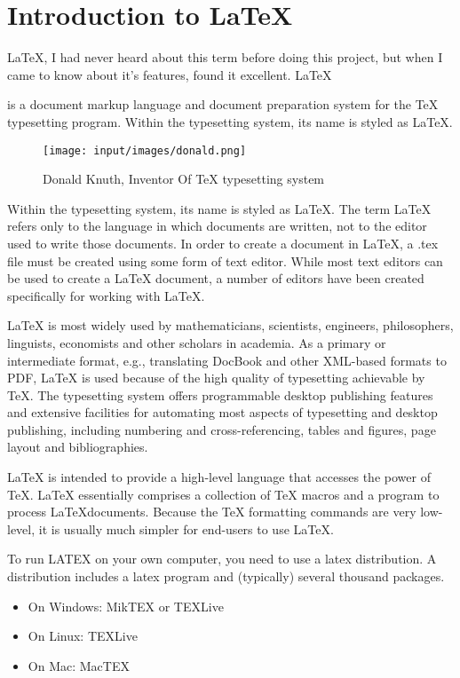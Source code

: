
\section{Introduction to \LaTeX}

\LaTeX, I had never heard about this term before doing this project,
but when I came to know about it's features, found it excellent. 
\LaTeX{ is a document markup language and document preparation system for the \TeX{} 
typesetting program. Within the typesetting system, its name is styled 
as \LaTeX.

\begin{figure}[!ht]
\centering
\texttt{[image: input/images/donald.png]}                   
\caption{Donald Knuth, Inventor Of \TeX{} 
typesetting system}
\hspace{-1.5em}
\end{figure}

Within the typesetting system, its name is styled as \LaTeX. The term 
\LaTeX{} refers only to the language in which documents are written, 
not to the editor used to write those documents. In order to create a 
document in \LaTeX, a .tex file must be created using some form of text 
editor. While most text editors can be used to create a \LaTeX{} document, 
a number of editors have been created specifically for working with \LaTeX.

\LaTeX{} is most widely used by mathematicians, scientists, 
engineers, philosophers, linguists, economists and other scholars in 
academia. As a primary or intermediate format, e.g., translating DocBook 
and other XML-based formats to PDF, \LaTeX{} is used because of the 
high quality of typesetting achievable by \TeX. The typesetting system 
offers programmable desktop publishing features and extensive facilities 
for automating most aspects of typesetting and desktop publishing, 
including numbering and cross-referencing, tables and figures, 
page layout and bibliographies.

\LaTeX{} is intended to provide a high-level language that
accesses the power of \TeX. \LaTeX{} essentially comprises a
collection of \TeX{} macros and a program to process \LaTeX documents. 
Because the \TeX{} formatting commands are very low-level, it is usually 
much simpler for end-users to use \LaTeX{}.

To run LATEX on your own computer, you need  to use a latex distribution. A distribution includes a latex program and (typically) several thousand packages.
\begin{itemize}
  \item  On Windows: MikTEX or TEXLive
   \item On Linux: TEXLive
  \item  On Mac: MacTEX
\end{itemize}
}
